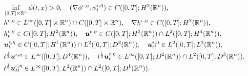 \documentclass[10pt,a4paper]{amsart}
\begin{document}
\begin{align}
&\inf_{[0,T]\times \mathbb{R}^n}\phi(t,x)>0,\quad (\nabla \phi^{\epsilon,\eta},\phi^{\epsilon,\eta}_t)\in C([0,T];H^2(\mathbb{R}^n)), \notag\\
&h^{\epsilon,\eta}\in L^\infty([0,T]\times \mathbb{R}^n)\cap C([0,T]\times \mathbb{R}^n),\quad \nabla h^{\epsilon,\eta}\in C([0,T];H^2(\mathbb{R}^n)),\notag\\
&h^{\epsilon,\eta}_t\in C([0,T];H^2(\mathbb{R}^n)),\quad \boldsymbol{u}^{\epsilon,\eta}\in C([0,T];H^3(\mathbb{R}^n))\cap L^2([0,T];H^4(\mathbb{R}^n)),\\
& \boldsymbol{u}^{\epsilon,\eta}_t\in C([0,T];H^1(\mathbb{R}^n))\cap L^2([0,T];D^2(\mathbb{R}^n)),\quad \boldsymbol{u}^{\epsilon,\eta}_{tt}\in L^2([0,T];L^2(\mathbb{R}^n)),\notag\\
&t^{\frac{1}{2}}\boldsymbol{u}^{\epsilon,\eta}\in L^\infty([0,T];D^4(\mathbb{R}^n)), \quad t^{\frac{1}{2}}\boldsymbol{u}^{\epsilon,\eta}_t\in L^\infty([0,T];D^2(\mathbb{R}^n))\cap L^2([0,T];D^3(\mathbb{R}^n)),\notag\\
& t^{\frac{1}{2}}\boldsymbol{u}^{\epsilon,\eta}_{tt}\in L^\infty([0,T];L^2(\mathbb{R}^n))\cap L^2([0,T];D^1(\mathbb{R}^n)).\notag
\end{align}
\end{document}
